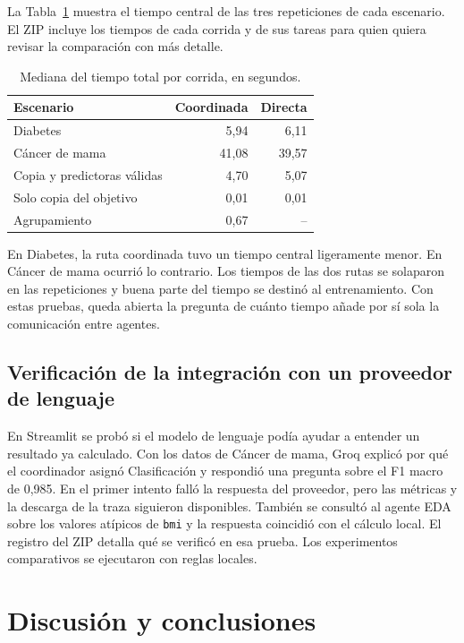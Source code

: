 \documentclass[11pt]{article}
\begin{document}
La Tabla~\ref{tab:tiempos} muestra el tiempo central de las tres repeticiones de cada escenario. El ZIP incluye los tiempos de cada corrida y de sus tareas para quien quiera revisar la comparación con más detalle.

\begin{table}[htbp]
\centering
\caption{Mediana del tiempo total por corrida, en segundos.}
\label{tab:tiempos}
\begin{tabular}{@{}lrr@{}}
\toprule
Escenario & Coordinada & Directa \\
\midrule
Diabetes & 5,94 & 6,11 \\
Cáncer de mama & 41,08 & 39,57 \\
Copia y predictoras válidas & 4,70 & 5,07 \\
Solo copia del objetivo & 0,01 & 0,01 \\
Agrupamiento & 0,67 & -- \\
\bottomrule
\end{tabular}
\end{table}

En Diabetes, la ruta coordinada tuvo un tiempo central ligeramente menor. En Cáncer de mama ocurrió lo contrario. Los tiempos de las dos rutas se solaparon en las repeticiones y buena parte del tiempo se destinó al entrenamiento. Con estas pruebas, queda abierta la pregunta de cuánto tiempo añade por sí sola la comunicación entre agentes.

\subsection{Verificación de la integración con un proveedor de lenguaje}

En Streamlit se probó si el modelo de lenguaje podía ayudar a entender un resultado ya calculado. Con los datos de Cáncer de mama, Groq explicó por qué el coordinador asignó Clasificación y respondió una pregunta sobre el F1 macro de 0,985. En el primer intento falló la respuesta del proveedor, pero las métricas y la descarga de la traza siguieron disponibles. También se consultó al agente EDA sobre los valores atípicos de \texttt{bmi} y la respuesta coincidió con el cálculo local. El registro del ZIP detalla qué se verificó en esa prueba. Los experimentos comparativos se ejecutaron con reglas locales.

\section{Discusión y conclusiones}
\end{document}
